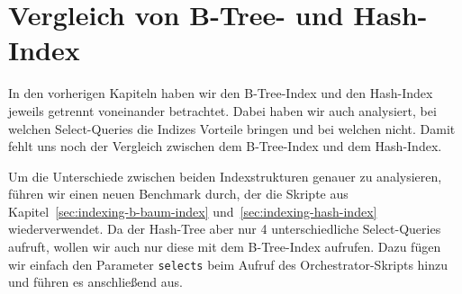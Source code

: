 \section{Vergleich von B-Tree- und Hash-Index}\label{sec:indexing-comp-b-tree-hash-index}

In den vorherigen Kapiteln haben wir den B-Tree-Index und den Hash-Index jeweils getrennt voneinander betrachtet.
Dabei haben wir auch analysiert, bei welchen Select-Queries die Indizes Vorteile bringen und bei welchen nicht.
Damit fehlt uns noch der Vergleich zwischen dem B-Tree-Index und dem Hash-Index.

Um die Unterschiede zwischen beiden Indexstrukturen genauer zu analysieren, führen wir einen neuen Benchmark durch, der die Skripte aus Kapitel~\ref{sec:indexing-b-baum-index} und~\ref{sec:indexing-hash-index} wiederverwendet.
Da der Hash-Tree aber nur 4 unterschiedliche Select-Queries aufruft, wollen wir auch nur diese mit dem B-Tree-Index aufrufen.
Dazu fügen wir einfach den Parameter \texttt{selects} beim Aufruf des Orchestrator-Skripts hinzu und führen es anschließend aus.

